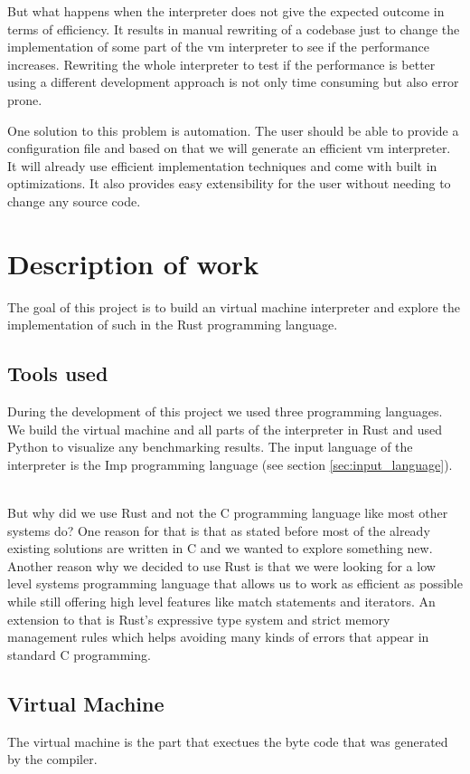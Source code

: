 \documentclass{article}
\begin{document}
But what happens when the interpreter does not give the expected outcome in
terms of efficiency. It results in manual rewriting of a codebase just to
change the implementation of some part of the vm interpreter to see if the
performance increases.
Rewriting the whole interpreter to test if the performance is better using
a different development approach is not only time consuming but also error 
prone.

One solution to this problem is automation. The user should be able to provide
a configuration file and based on that we will generate an efficient vm 
interpreter. It will already use efficient implementation techniques and come
with built in optimizations. It also provides easy extensibility for the user
without needing to change any source code.

\section{Description of work}
The goal of this project is to build an virtual machine interpreter and 
explore the implementation of such in the Rust programming language.

\subsection{Tools used}
During the development of this project we used three programming languages. We
build the virtual machine and all parts of the interpreter in Rust and used
Python to visualize any benchmarking results. The input language of the
interpreter is the Imp programming language (see section
\ref{sec:input_language}). ~\cite{Pierce:SF1}

But why did we use Rust and not the C programming language like most other
systems do?
One reason for that is that as stated before most of the already existing
solutions are written in C and we wanted to explore something new.
Another reason why we decided to use Rust is that we were looking for a low level
systems programming language that allows us to work as efficient as possible
while still offering high level features like match statements and iterators.
An extension to that is Rust's expressive type system and strict memory
management rules which helps avoiding many kinds of errors that appear in 
standard C programming.

\subsection{Virtual Machine} %
The virtual machine is the part that exectues the byte code that was generated
by the compiler.
\end{document}

